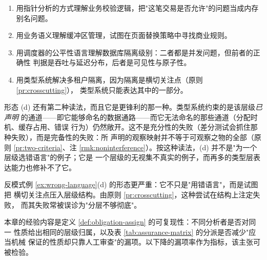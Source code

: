 \begin{example}[具体形态]\label{ex:wrong-language}
\begin{enumerate}[label=(\alph*)]
\item 用指针分析的方式理解业务校验逻辑，把"这笔交易是否允许"的问题当成内存别名问题。
\item 用业务语义理解缓冲区管理，试图在页面替换策略中寻找商业规则。
\item 用调度器的公平性语言理解数据库隔离级别：二者都是并发问题，但前者的正确性
      判据是吞吐与延迟分布，后者是可见性与原子性。
\item 用类型系统解决多租户隔离，因为隔离是横切关注点（原则 \ref{pr:crosscutting}），
      类型系统只能表达其中的一部分。
\end{enumerate}
形态 (d) 还有第二种读法，而且它是更锋利的那一种。类型系统约束的是该层级\emph{已声明}
的通道——即它能够命名的数据通路——而它无法命名的那些通道（分配时机、缓存占用、错误
行为）仍然敞开。这不是充分性的失败（差分测试会抓住那种失败），而是完备性的失败：所
声明的观察映射并不等于可观察之物的全部（原则 \ref{pr:two-criteria}、注
\ref{rmk:noninterference}）。按这种读法，(d) 并不是"为一个层级选错语言"的例子；它是
一个层级的无视集不真实的例子，而再多的类型层表达能力也修补不了它。
\end{example}

反模式例 \ref{ex:wrong-language}(d) 的形态更严重：它不只是"用错语言"，而是试图把
横切关注点压入层级结构。由原则 \ref{pr:crosscutting}，这种尝试在结构上注定失败，
而其失败常被误诊为"分层不够彻底"。

本章的经验内容是定义 \ref{def:obligation-assign} 的可复现性：不同分析者是否对同一
性质给出相同的层级归属，以及表 \ref{tab:assurance-matrix} 的分派是否减少"应当机械
保证的性质却只靠人工审查"的漏项。以下降的漏项率作为指标，该主张可被检验。
